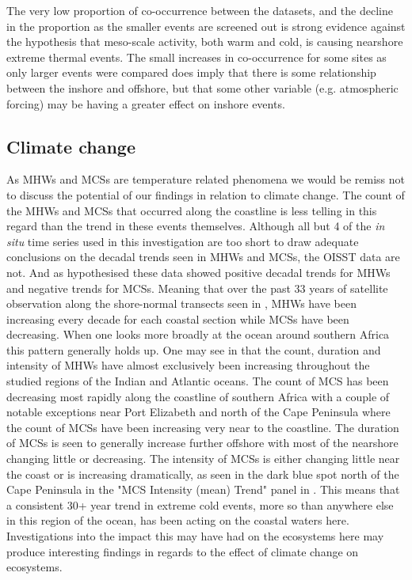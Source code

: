 \documentclass[a4paper,10pt,review]{elsarticle}
\begin{document}
The very low proportion of co-occurrence between the datasets, and the decline in the proportion as the smaller events are screened out is strong evidence against the hypothesis that meso-scale activity, both warm and cold, is causing nearshore extreme thermal events. The small increases in co-occurrence for some sites as only larger events were compared does imply that there is some relationship between the inshore and offshore, but that some other variable (e.g. atmospheric forcing) may be having a greater effect on inshore events.

\subsection{Climate change}
As MHWs and MCSs are temperature related phenomena we would be remiss not to discuss the potential of our findings in relation to climate change. The count of the MHWs and MCSs that occurred along the coastline is less telling in this regard than the trend in these events themselves. Although all but 4 of the \emph{in situ} time series used in this investigation are too short to draw adequate conclusions on the decadal trends seen in MHWs and MCSs, the OISST data are not. And as hypothesised these data showed positive decadal trends for MHWs and negative trends for MCSs. Meaning that over the past 33 years of satellite observation along the shore-normal transects seen in , MHWs have been increasing every decade for each coastal section while MCSs have been decreasing. When one looks more broadly at the ocean around southern Africa this pattern generally holds up. One may see in  that the count, duration and intensity of MHWs have almost exclusively been increasing throughout the studied regions of the Indian and Atlantic oceans. The count of MCS has been decreasing most rapidly along the coastline of southern Africa with a couple of notable exceptions near Port Elizabeth and north of the Cape Peninsula where the count of MCSs have been increasing very near to the coastline. The duration of MCSs is seen to generally increase further offshore with most of the nearshore changing little or decreasing. The intensity of MCSs is either changing little near the coast or is increasing dramatically, as seen in the dark blue spot north of the Cape Peninsula in the "MCS Intensity (mean) Trend" panel in . This means that a consistent 30+ year trend in extreme cold events, more so than anywhere else in this region of the ocean, has been acting on the coastal waters here. Investigations into the impact this may have had on the ecosystems here may produce interesting findings in regards to the effect of climate change on ecosystems.
\end{document}
